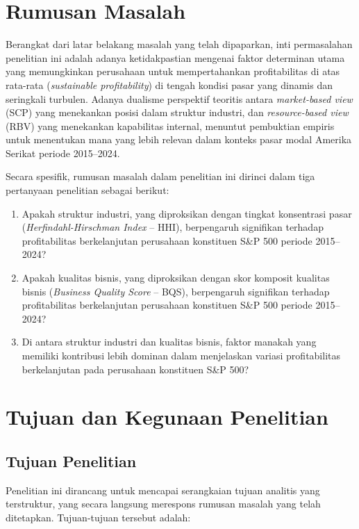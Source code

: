 \documentclass[12pt,a4paper]{report}
\begin{document}
\section{Rumusan Masalah}

Berangkat dari latar belakang masalah yang telah dipaparkan, inti permasalahan penelitian ini adalah adanya ketidakpastian mengenai faktor determinan utama yang memungkinkan perusahaan untuk mempertahankan profitabilitas di atas rata-rata (\textit{sustainable profitability}) di tengah kondisi pasar yang dinamis dan seringkali turbulen. Adanya dualisme perspektif teoritis antara \textit{market-based view} (SCP) yang menekankan posisi dalam struktur industri, dan \textit{resource-based view} (RBV) yang menekankan kapabilitas internal, menuntut pembuktian empiris untuk menentukan mana yang lebih relevan dalam konteks pasar modal Amerika Serikat periode 2015--2024.

Secara spesifik, rumusan masalah dalam penelitian ini dirinci dalam tiga pertanyaan penelitian sebagai berikut:

\begin{enumerate}
    \item Apakah struktur industri, yang diproksikan dengan tingkat konsentrasi pasar (\textit{Herfindahl-Hirschman Index} -- HHI), berpengaruh signifikan terhadap profitabilitas berkelanjutan perusahaan konstituen S\&P 500 periode 2015--2024?
    \item Apakah kualitas bisnis, yang diproksikan dengan skor komposit kualitas bisnis (\textit{Business Quality Score} -- BQS), berpengaruh signifikan terhadap profitabilitas berkelanjutan perusahaan konstituen S\&P 500 periode 2015--2024?
    \item Di antara struktur industri dan kualitas bisnis, faktor manakah yang memiliki kontribusi lebih dominan dalam menjelaskan variasi profitabilitas berkelanjutan pada perusahaan konstituen S\&P 500?
\end{enumerate}

\section{Tujuan dan Kegunaan Penelitian}

\subsection{Tujuan Penelitian}

Penelitian ini dirancang untuk mencapai serangkaian tujuan analitis yang terstruktur, yang secara langsung merespons rumusan masalah yang telah ditetapkan. Tujuan-tujuan tersebut adalah:
\end{document}
